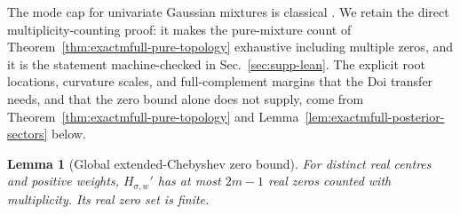 \documentclass[aps,physrev,onecolumn,amsmath,amssymb,longbibliography]{revtex4-2}
\newtheorem{lemma}[theorem]{Lemma}
\begin{document}
The mode cap for univariate Gaussian mixtures is classical
\cite{carreiraPerpinanWilliams2003modes,amendolaEngstromHaase2020modes}.
We retain the direct multiplicity-counting proof: it makes the pure-mixture
count of Theorem~\ref{thm:exactmfull-pure-topology} exhaustive including
multiple zeros, and it is the statement machine-checked in
Sec.~\ref{sec:supp-lean}.  The explicit root locations, curvature scales,
and full-complement margins that the Doi transfer needs, and that the zero
bound alone does not supply, come from
Theorem~\ref{thm:exactmfull-pure-topology} and
Lemma~\ref{lem:exactmfull-posterior-sectors} below.

\begin{lemma}[Global extended-Chebyshev zero bound]
\label{lem:exactmfull-zero-bound}
For distinct real centres and positive weights,
\(H_{\sigma,w}'\) has at most \(2m-1\) real zeros counted with
multiplicity.  Its real zero set is finite.
\end{lemma}
\end{document}
